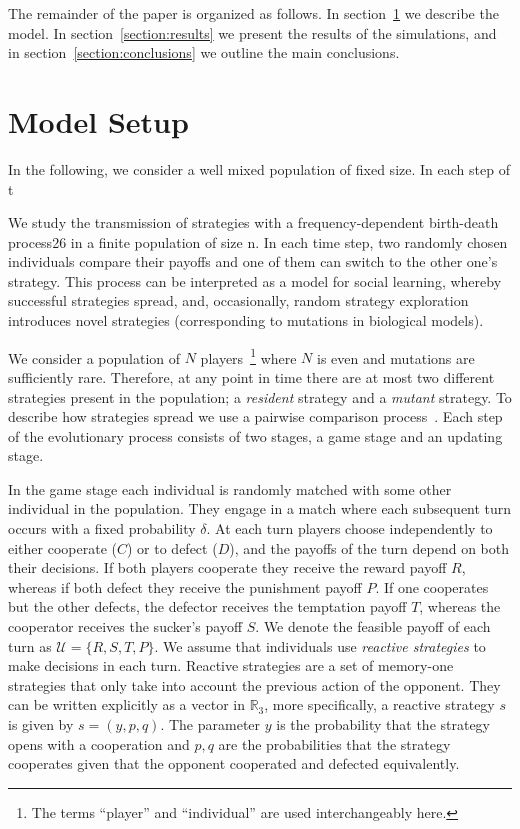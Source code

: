 \documentclass[11pt]{article}
\newcommand{\R}{\mathbb{R}}
\theoremstyle{plainCl1}
\theoremstyle{plainCl2}
\begin{document}
The remainder of the paper is organized as follows. In
section~\ref{section:model} we describe the model. In
section~\ref{section:results} we present the results of the simulations, and in
section~\ref{section:conclusions} we outline the main conclusions.

\section{Model Setup}\label{section:model}

In the following, we consider a well mixed population of fixed size. In each
step of t

We study the transmission of strategies with a frequency-dependent birth-death
process26 in a finite population of size n. In each time step, two randomly
chosen individuals compare their payoffs and one of them can switch to the other
one's strategy. This process can be interpreted as a model for social learning,
whereby successful strategies spread, and, occasionally, random strategy
exploration introduces novel strategies (corresponding to mutations in
biological models).

We consider a population of \(N\) players~\footnote{The terms ``player'' and
``individual'' are used interchangeably here.} where \(N\) is even and mutations
are sufficiently rare. Therefore, at any point in time there are at most two
different strategies present in the population; a \textit{resident} strategy and
a \textit{mutant} strategy. To describe how strategies spread we use a pairwise
comparison process~\cite{Traulsen2006}. Each step of the evolutionary process
consists of two stages, a game stage and an updating stage.

In the game stage each individual is randomly matched with some other individual
in the population. They engage in a match where each subsequent turn occurs with
a fixed probability $\delta$. At each turn players choose independently to
either cooperate (\(C\)) or to defect (\(D\)), and the payoffs of the turn
depend on both their decisions. If both players cooperate they receive the
reward payoff \(R\), whereas if both defect they receive the punishment payoff
\(P\). If one cooperates but the other defects, the defector receives the
temptation payoff \(T\), whereas the cooperator receives the sucker's payoff
\(S\). We denote the feasible payoff of each turn as \(\mathcal{U} = \{R, S, T,
P\}\). We assume that individuals use \textit{reactive strategies} to make
decisions in each turn. Reactive strategies are a set of memory-one strategies
that only take into account the previous action of the opponent. They can be
written explicitly as a vector in \(\R_{3}\), more specifically, a reactive
strategy \(s\) is given by \(s=(y, p, q)\). The parameter \(y\) is the
probability that the strategy opens with a cooperation and \(p, q\) are the
probabilities that the strategy cooperates given that the opponent cooperated
and defected equivalently.
\end{document}
